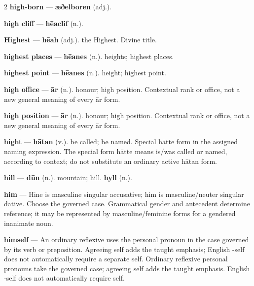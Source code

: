 \begin{multicols}{2}
\textbf{high-born} — \textbf{æðelboren} (adj.).\par
\textbf{high cliff} — \textbf{hēaclif} (n.).\par
\textbf{Highest} — \textbf{hēah} (adj.). the Highest. Divine title.\par
\textbf{highest places} — \textbf{hēanes} (n.). heights; highest places.\par
\textbf{highest point} — \textbf{hēanes} (n.). height; highest point.\par
\textbf{high office} — \textbf{ār} (n.). honour; high position. Contextual rank or office, not a new general meaning of every ār form.\par
\textbf{high position} — \textbf{ār} (n.). honour; high position. Contextual rank or office, not a new general meaning of every ār form.\par
\textbf{hight} — \textbf{hātan} (v.). be called; be named. Special hātte form in the assigned naming expression. The special form hātte means is/was called or named, according to context; do not substitute an ordinary active hātan form.\par
\textbf{hill} — \textbf{dūn} (n.). mountain; hill. \textbf{hyll} (n.).\par
\textbf{him} — Hine is masculine singular accusative; him is masculine/neuter singular dative. Choose the governed case. Grammatical gender and antecedent determine reference; it may be represented by masculine/feminine forms for a gendered inanimate noun.\par
\textbf{himself} — An ordinary reflexive uses the personal pronoun in the case governed by its verb or preposition. Agreeing self adds the taught emphasis; English -self does not automatically require a separate self. Ordinary reflexive personal pronouns take the governed case; agreeing self adds the taught emphasis. English -self does not automatically require self.\par

\end{multicols}
